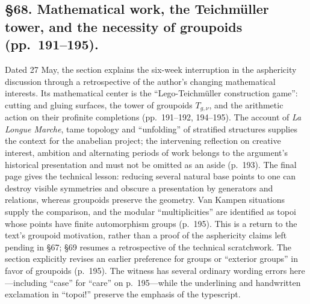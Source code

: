 \documentclass[10pt,oneside]{book}
\begin{document}
\subsection*{\S68. Mathematical work, the Teichmüller tower, and the necessity of groupoids (pp.\ 191--195).}
Dated 27 May, the section explains the six-week interruption in the asphericity discussion through a retrospective of the author's changing mathematical interests. Its mathematical center is the ``Lego-Teichmüller construction game'': cutting and gluing surfaces, the tower of groupoids $T_{g,\nu}$, and the arithmetic action on their profinite completions (pp.\ 191--192, 194--195). The account of \emph{La Longue Marche}, tame topology and ``unfolding'' of stratified structures supplies the context for the anabelian project; the intervening reflection on creative interest, ambition and alternating periods of work belongs to the argument's historical presentation and must not be omitted as an aside (p.\ 193). The final page gives the technical lesson: reducing several natural base points to one can destroy visible symmetries and obscure a presentation by generators and relations, whereas groupoids preserve the geometry. Van Kampen situations supply the comparison, and the modular ``multiplicities'' are identified as topoi whose points have finite automorphism groups (p.\ 195). This is a return to the text's groupoid motivation, rather than a proof of the asphericity claims left pending in \S67; \S69 resumes a retrospective of the technical scratchwork. The section explicitly revises an earlier preference for groups or ``exterior groups'' in favor of groupoids (p.\ 195). The witness has several ordinary wording errors here---including ``case'' for ``care'' on p.\ 195---while the underlining and handwritten exclamation in ``topoi!'' preserve the emphasis of the typescript.
\end{document}
